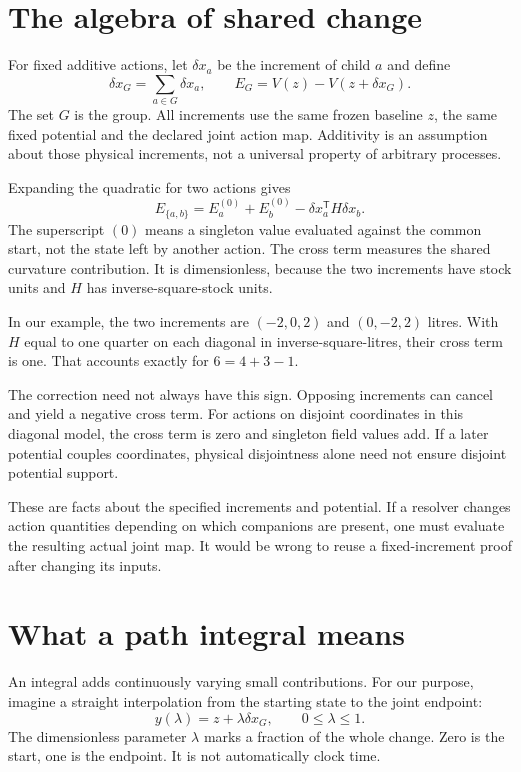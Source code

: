 \section{The algebra of shared change}
For fixed additive actions, let $\delta x_a$ be the increment of child $a$ and define
\begin{equation}\label{eq:group}
 \delta x_G=\sum_{a\in G}\delta x_a,\qquad
 E_G=V(z)-V(z+\delta x_G).
\end{equation}
The set $G$ is the group. All increments use the same frozen baseline $z$, the same fixed potential and the declared joint action map. Additivity is an assumption about those physical increments, not a universal property of arbitrary processes.

Expanding the quadratic for two actions gives
\begin{equation}\label{eq:cross}
 E_{\{a,b\}}=E_a^{(0)}+E_b^{(0)}
 -\delta x_a^{\mathsf T}H\delta x_b.
\end{equation}
The superscript $(0)$ means a singleton value evaluated against the common start, not the state left by another action. The cross term measures the shared curvature contribution. It is dimensionless, because the two increments have stock units and $H$ has inverse-square-stock units.

In our example, the two increments are $(-2,0,2)$ and $(0,-2,2)$ litres. With $H$ equal to one quarter on each diagonal in inverse-square-litres, their cross term is one. That accounts exactly for $6=4+3-1$.

The correction need not always have this sign. Opposing increments can cancel and yield a negative cross term. For actions on disjoint coordinates in this diagonal model, the cross term is zero and singleton field values add. If a later potential couples coordinates, physical disjointness alone need not ensure disjoint potential support.

These are facts about the specified increments and potential. If a resolver changes action quantities depending on which companions are present, one must evaluate the resulting actual joint map. It would be wrong to reuse a fixed-increment proof after changing its inputs.

\section{What a path integral means}
An integral adds continuously varying small contributions. For our purpose, imagine a straight interpolation from the starting state to the joint endpoint:
\begin{equation*}
 y(\lambda)=z+\lambda\delta x_G,\qquad 0\leq\lambda\leq1.
\end{equation*}
The dimensionless parameter $\lambda$ marks a fraction of the whole change. Zero is the start, one is the endpoint. It is not automatically clock time.

